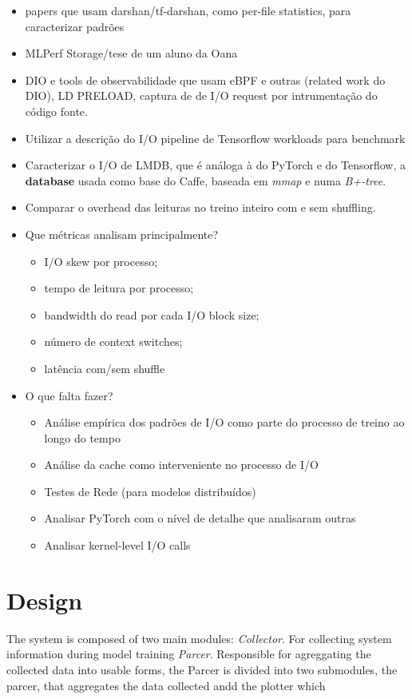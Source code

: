 \documentclass[conference]{IEEEtran}
\begin{document}
\begin{itemize}
    \item papers que usam darshan/tf-darshan, como per-file statistics, para caracterizar padrões \cite{9229605} \cite{zoomin} 
    \item MLPerf Storage/tese de um aluno da Oana
    \item DIO e tools de observabilidade que usam eBPF e outras (related work do DIO), LD PRELOAD, captura de de I/O request por intrumentação do código fonte.
    \item Utilizar a descrição do I/O pipeline de Tensorflow workloads para benchmark \cite{8638422}
    \item Caracterizar o I/O de LMDB, que é análoga à do PyTorch e do Tensorflow, a \textbf{database} usada como base do Caffe, baseada em \textit{mmap} e numa \textit{B+-tree}. \cite{LMDB}
    \item Comparar o overhead das leituras no treino inteiro com e sem shuffling. \cite{initial}
    \item Que métricas analisam principalmente?
    \begin{itemize}
        \item I/O skew por processo;
        \item tempo de leitura por processo;
        \item bandwidth do read por cada I/O block size;
        \item número de context switches;
        \item latência com/sem shuffle
    \end{itemize} 
    \item O que falta fazer?
    \begin{itemize}
        \item Análise empírica dos padrões de I/O como parte do processo de treino ao longo do tempo
        \item Análise da cache como interveniente no processo de I/O
        \item Testes de Rede (para modelos distribuídos)
        \item Analisar PyTorch com o nível de detalhe que analisaram outras
        \item Analisar kernel-level I/O calls 
    \end{itemize}
\end{itemize}

\section{Design}
    The system is composed of two main modules:
    \textit{Collector}. For collecting system information during model training
    \textit{Parcer}. Responsible for agreggating the collected data into usable forms, the Parcer is divided into two submodules, the parcer, that aggregates the data collected andd the plotter which  
\end{document}
